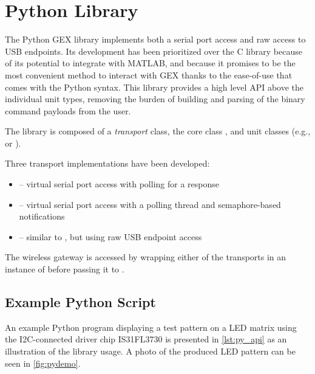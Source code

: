 \section{Python Library}

The Python GEX library implements both a serial port access and raw access to \gls{USB} endpoints. Its development has been prioritized over the C library because of its potential to integrate with MATLAB, and because it promises to be the most convenient method to interact with GEX thanks to the ease-of-use that comes with the Python syntax. This library provides a high level \gls{API} above the individual unit types, removing the burden of building and parsing of the binary command payloads from the user.

The library is composed of a \textit{transport} class, the core class , and unit classes (e.g.,  or ). 

\noindent
Three transport implementations have been developed:

\begin{itemize}
    \item {} -- virtual serial port access with polling for a response

    \item {} -- virtual serial port access with a polling thread and semaphore-based notifications

    \item {} -- similar to , but using raw USB endpoint access
\end{itemize}

The wireless gateway is accessed by wrapping either of the transports in an instance of  before passing it to .

\subsection{Example Python Script} \label{sec:ex_python_script}

An example Python program displaying a test pattern on a \gls{LED} matrix using the \gls{I2C}-connected driver chip IS31FL3730 is presented in \cref{lst:py_api} as an illustration of the library usage. A photo of the produced \gls{LED} pattern can be seen in \cref{fig:pydemo}.

